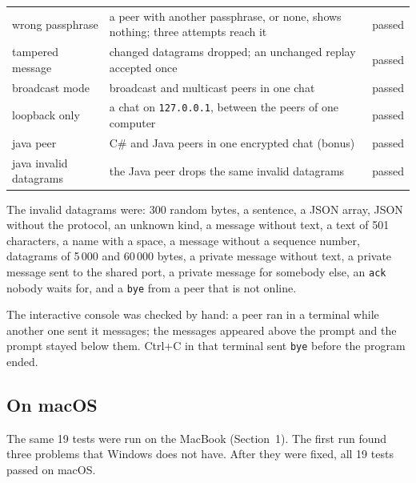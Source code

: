 \documentclass[11pt,a4paper]{article}
\newcommand{\code}[1]{{\frenchspacing\texttt{#1}}}
\begin{document}
\begin{center}
\begin{tabularx}{\linewidth}{@{}lXc@{}}
wrong passphrase & a peer with another passphrase, or none, shows nothing; three attempts reach it & passed \\
tampered message & changed datagrams dropped; an unchanged replay accepted once & passed \\
broadcast mode & broadcast and multicast peers in one chat & passed \\
loopback only & a chat on \code{127.0.0.1}, between the peers of one computer & passed \\
java peer & C\# and Java peers in one encrypted chat (bonus) & passed \\
java invalid datagrams & the Java peer drops the same invalid datagrams & passed \\
\bottomrule
\end{tabularx}
\end{center}

The invalid datagrams were: 300 random bytes, a sentence, a JSON array, JSON without the protocol, an
unknown kind, a message without text, a text of 501 characters, a name with a space, a message without
a sequence number, datagrams of 5\,000 and 60\,000 bytes, a private message without text, a private
message sent to the shared port, a private message for somebody else, an \code{ack} nobody waits for,
and a \code{bye} from a peer that is not online.

The interactive console was checked by hand: a peer ran in a terminal while another one sent it
messages; the messages appeared above the prompt and the prompt stayed below them. Ctrl+C in that
terminal sent \code{bye} before the program ended.

\subsection{On macOS}\label{sec:macos}

The same 19 tests were run on the MacBook (Section~1). The first run found three problems that
Windows does not have. After they were fixed, all 19 tests passed on macOS.
\end{document}
